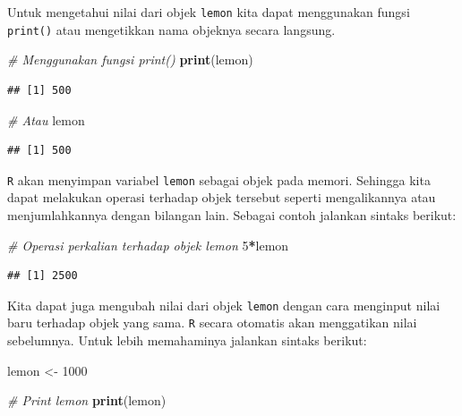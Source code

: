 \documentclass[
]{book}
\newenvironment{Shaded}{\begin{snugshade}}{\end{snugshade}}
\newcommand{\CommentTok}[1]{\textcolor[rgb]{0.56,0.35,0.01}{\textit{#1}}}
\newcommand{\DecValTok}[1]{\textcolor[rgb]{0.00,0.00,0.81}{#1}}
\newcommand{\FunctionTok}[1]{\textcolor[rgb]{0.13,0.29,0.53}{\textbf{#1}}}
\newcommand{\NormalTok}[1]{#1}
\newcommand{\OtherTok}[1]{\textcolor[rgb]{0.56,0.35,0.01}{#1}}
\newcommand{\SpecialCharTok}[1]{\textcolor[rgb]{0.81,0.36,0.00}{\textbf{#1}}}
\theoremstyle{definition}
\theoremstyle{definition}
\theoremstyle{definition}
\theoremstyle{definition}
\theoremstyle{remark}
\begin{document}
Untuk mengetahui nilai dari objek \texttt{lemon} kita dapat menggunakan fungsi \texttt{print()} atau mengetikkan nama objeknya secara langsung.

\begin{Shaded}
\begin{Highlighting}[]
\CommentTok{\# Menggunakan fungsi print()}
\FunctionTok{print}\NormalTok{(lemon)}
\end{Highlighting}
\end{Shaded}

\begin{verbatim}
## [1] 500
\end{verbatim}

\begin{Shaded}
\begin{Highlighting}[]
\CommentTok{\# Atau}
\NormalTok{lemon}
\end{Highlighting}
\end{Shaded}

\begin{verbatim}
## [1] 500
\end{verbatim}

\texttt{R} akan menyimpan variabel \texttt{lemon} sebagai objek pada memori. Sehingga kita dapat melakukan operasi terhadap objek tersebut seperti mengalikannya atau menjumlahkannya dengan bilangan lain. Sebagai contoh jalankan sintaks berikut:

\begin{Shaded}
\begin{Highlighting}[]
\CommentTok{\# Operasi perkalian terhadap objek lemon}
\DecValTok{5}\SpecialCharTok{*}\NormalTok{lemon}
\end{Highlighting}
\end{Shaded}

\begin{verbatim}
## [1] 2500
\end{verbatim}

Kita dapat juga mengubah nilai dari objek \texttt{lemon} dengan cara menginput nilai baru terhadap objek yang sama. \texttt{R} secara otomatis akan menggatikan nilai sebelumnya. Untuk lebih memahaminya jalankan sintaks berikut:

\begin{Shaded}
\begin{Highlighting}[]
\NormalTok{lemon }\OtherTok{\textless{}{-}} \DecValTok{1000}

\CommentTok{\# Print lemon}
\FunctionTok{print}\NormalTok{(lemon)}
\end{Highlighting}
\end{Shaded}
\end{document}

